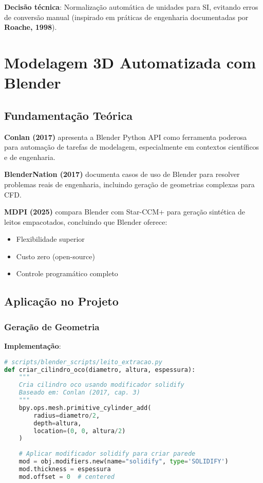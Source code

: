 \documentclass[12pt,a4paper]{article}
\begin{document}
\textbf{Decisão técnica}: Normalização automática de unidades para SI, evitando erros de conversão manual (inspirado em práticas de engenharia documentadas por \textbf{Roache, 1998}).

\section{Modelagem 3D Automatizada com Blender}

\subsection{Fundamentação Teórica}

\textbf{Conlan (2017)} apresenta a Blender Python API como ferramenta poderosa para automação de tarefas de modelagem, especialmente em contextos científicos e de engenharia.

\textbf{BlenderNation (2017)} documenta casos de uso de Blender para resolver problemas reais de engenharia, incluindo geração de geometrias complexas para CFD.

\textbf{MDPI (2025)} compara Blender com Star-CCM+ para geração sintética de leitos empacotados, concluindo que Blender oferece:
\begin{itemize}
    \item Flexibilidade superior
    \item Custo zero (open-source)
    \item Controle programático completo
\end{itemize}

\subsection{Aplicação no Projeto}

\subsubsection{Geração de Geometria}

\textbf{Implementação}:
\begin{lstlisting}[language=Python, caption=Geração de cilindro oco com Blender]
# scripts/blender_scripts/leito_extracao.py
def criar_cilindro_oco(diametro, altura, espessura):
    """
    Cria cilindro oco usando modificador solidify
    Baseado em: Conlan (2017, cap. 3)
    """
    bpy.ops.mesh.primitive_cylinder_add(
        radius=diametro/2,
        depth=altura,
        location=(0, 0, altura/2)
    )
    
    # Aplicar modificador solidify para criar parede
    mod = obj.modifiers.new(name="solidify", type='SOLIDIFY')
    mod.thickness = espessura
    mod.offset = 0  # centered
\end{lstlisting}
\end{document}
